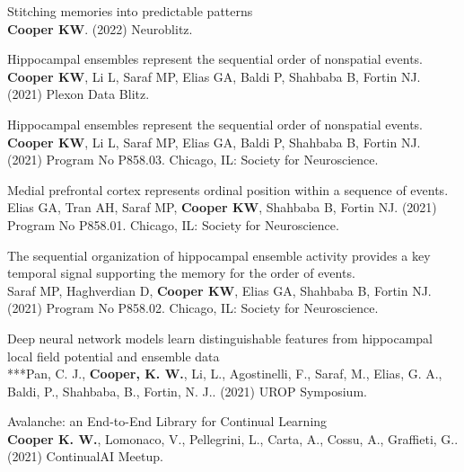 \documentclass[10pt]{cooperCV2}
\begin{document}
 
\begin{etaremune}[itemindent=-1.5\bibhang, topsep=0pt,
				   itemsep=\bibsep,partopsep=0pt,parsep=0pt,leftmargin={\bibhang+\widthof{[999]}}] 
    
    \item Stitching memories into predictable patterns\\ \textbf{Cooper KW}. (2022) Neuroblitz. 
     
	
    \item Hippocampal ensembles represent the sequential order of nonspatial events.\\ \textbf{Cooper KW}, Li L, Saraf MP, Elias GA, Baldi P, Shahbaba B, Fortin NJ. (2021) Plexon Data Blitz. 
     
	
    \item Hippocampal ensembles represent the sequential order of nonspatial events.\\ \textbf{Cooper KW}, Li L, Saraf MP, Elias GA, Baldi P, Shahbaba B, Fortin NJ. (2021) Program No P858.03. Chicago, IL: Society for Neuroscience. 
     
	
    \item Medial prefrontal cortex represents ordinal position within a sequence of events.\\ Elias GA, Tran AH, Saraf MP, \textbf{Cooper KW}, Shahbaba B, Fortin NJ. (2021) Program No P858.01. Chicago, IL: Society for Neuroscience. 
     
	
    \item The sequential organization of hippocampal ensemble activity provides a key temporal signal supporting the memory for the order of events.\\ Saraf MP, Haghverdian D, \textbf{Cooper KW}, Elias GA, Shahbaba B, Fortin NJ. (2021) Program No P858.02. Chicago, IL: Society for Neuroscience. 
     
	
    \item Deep neural network models learn distinguishable features from hippocampal local field potential and ensemble data\\ ***Pan, C. J., \textbf{Cooper, K. W.}, Li, L., Agostinelli, F., Saraf, M., Elias, G. A., Baldi, P.,  Shahbaba, B., Fortin, N. J.. (2021) UROP Symposium. 
     
	
    \item Avalanche: an End-to-End Library for Continual Learning\\ \textbf{Cooper K. W.}, Lomonaco, V., Pellegrini, L., Carta, A., Cossu, A., Graffieti, G.. (2021) ContinualAI Meetup. 
     

\end{etaremune}
\end{document}
